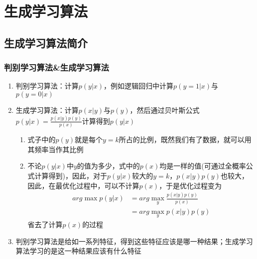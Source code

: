 \section{生成学习算法}
\subsection{生成学习算法简介}

\subsubsection{判别学习算法\&生成学习算法}
\begin{enumerate}
	\item 判别学习算法：计算$p(y|x)$，例如逻辑回归中计算$p(y=1|x)$与$p(y=0|x)$
	\item 生成学习算法：计算$p(x|y)$与$p(y)$，然后通过贝叶斯公式$p(y|x) = \frac{p(x|y)p(y)}{p(x)}$计算得到$p(y|x)$
	\begin{enumerate}
		\item 式子中的$p(y)$就是每个$y=k$所占的比例，既然我们有了数据，就可以用其频率当作其比例
		\item 不论$p(y|x)$中$y$的值为多少，式中的$p(x)$均是一样的值(可通过全概率公式计算得到)，因此，对于$p(y|x)$较大的$y=k$，$p(x|y)p(y)$也较大，因此，在最优化过程中，可以不计算$p(x)$，于是优化过程变为
		\begin{align}
			arg\max{p(y|x)} &= arg \max_y{\frac{p(x|y)p(y)}{p(x)}} \\
			&= arg\max_y{p(x|y)p(y)}
		\end{align}
		省去了计算$p(x)$的过程
	\end{enumerate}
	
	\item 判别学习算法是给如一系列特征，得到这些特征应该是哪一种结果；生成学习算法学习的是这一种结果应该有什么特征

\end{enumerate}




















